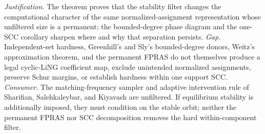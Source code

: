 \documentclass{article}
\begin{document}
\par\smallskip\noindent \textit{Justification.} The theorem proves that the stability filter changes the computational character of the same normalized-assignment representation whose unfiltered size is a permanent; the bounded-degree phase diagram and the one-SCC corollary sharpen where and why that separation persists. \textit{Gap.} Independent-set hardness, Greenhill's and Sly's bounded-degree donors, Weitz's approximation theorem, and the permanent FPRAS do not themselves produce a legal cyclic-LiNG coefficient map, exclude unintended normalized assignments, preserve Schur margins, or establish hardness within one support SCC. \textit{Consumer.} The matching-frequency sampler and adaptive intervention rule of Sharifian, Salehkaleybar, and Kiyavash are unfiltered. If equilibrium stability is additionally imposed, they must condition on the stable orbit; neither the permanent FPRAS nor SCC decomposition removes the hard within-component filter.
\end{document}

